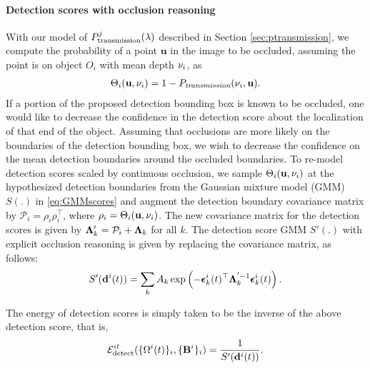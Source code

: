 \paragraph{Detection scores with occlusion reasoning} 
\def\u{\mathbf{u}}
With our model of $P^{j}_{\text{transmission}}(\lambda)$ described in Section \ref{sec:ptransmission}, we 
compute the probability of a point $\u$ in the image to be occluded, assuming
the point is on object $O_i$ with mean depth $\nu_i$, as
\begin{align}
  \Theta_{i}(\u, \meandepth{i}) = 1 - \Ptransmission(\meandepth{i}, \u).
\end{align}
If a portion of the proposed detection bounding box is known to be 
occluded, one would like to decrease the confidence in the detection score 
about the localization of that end of the object. Assuming that occlusions 
are more likely on the boundaries of the detection bounding box, we wish to decrease the 
confidence on the mean detection boundaries around the occluded boundaries.
To re-model detection scores scaled by continuous occlusion, we sample
$\Theta_{i}(\mathbf{u}, \nu_i)$ at the hypothesized detection boundaries from
the Gaussian mixture model (GMM) $S(.)$ in \eqref{eq:GMMscores} and augment the detection boundary covariance matrix by
$\mathcal{P}_{i} = \rho_{i}\rho_{i}^\top$, where $\rho_{i} = \Theta_{i}(\mathbf{u},
\nu_i)$. The new covariance matrix for the detection scores is given by 
  $\bm{\Lambda}'_k = \mathcal{P}_{i} + \bm{\Lambda}_k$ for all $k$.
The detection score GMM $S'(.)$ with explicit occlusion reasoning is given by replacing the covariance
matrix, as follows:
%
\begin{multline}
S'(\mathbf{d}^{i}(t)) = \sum_k A_k \exp \left( -{\bm{\epsilon}}_k^{i}(t)^\top \bm{\Lambda}_k^{'-1} {\bm{\epsilon}}_k^{i}(t) \right).
\end{multline}

The energy of detection scores is simply taken to be the inverse of the above detection score, that is,
\begin{align}
  \mathcal{E}^{it}_{\text{detect}}(\{ \Omega^{i}(t) \}_i, \{\mathbf{B}^{i}\}_i ) = \frac{1}{S'(\mathbf{d}^{i}(t))}.
\end{align}

